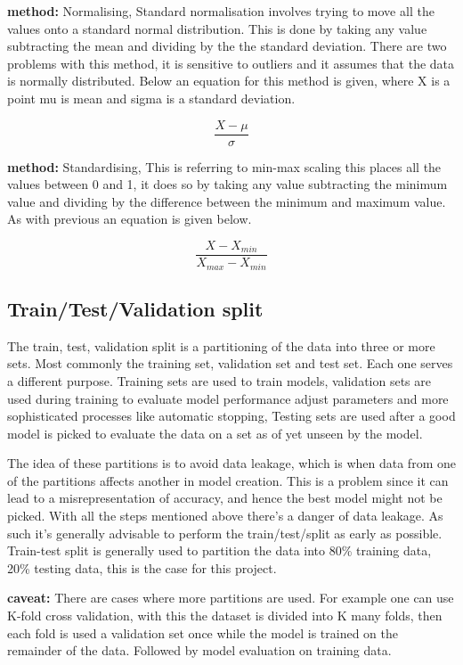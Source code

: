 \documentclass[a4paper]{article}
\begin{document}
\textbf{method:} Normalising, Standard normalisation involves trying to move all the values onto a standard normal distribution. This is done by taking any value subtracting the mean and dividing by the the standard deviation. There are two problems with this method, it is sensitive to outliers and it assumes that the data is normally distributed. Below an equation for this method is given, where X is a point mu is mean and sigma is a standard deviation.

$$\frac{X-\mu}{\sigma}$$

\textbf{method:} Standardising, This is referring to min-max scaling this places all the values between 0 and 1, it does so by taking any value subtracting the minimum value and dividing by the difference between the minimum and maximum value. As with previous an equation is given below. 

$$\frac{X - X_{min}}{X_{max} - X_{min}}$$

\subsection{Train/Test/Validation split}

The train, test, validation split is a partitioning of the data into three or more sets. Most commonly the training set, validation set and test set. Each one serves a different purpose. Training sets are used to train models, validation sets are used during training to evaluate model performance adjust parameters and more sophisticated processes like automatic stopping, Testing sets are used after a good model is picked to evaluate the data on a set as of yet unseen by the model.

The idea of these partitions is to avoid data leakage, which is when data from one of the partitions affects another in model creation. This is a problem since it can lead to a misrepresentation of accuracy, and hence the best model might not be picked. With all the steps mentioned above there's a danger of data leakage. As such it's generally advisable to perform the train/test/split as early as possible. Train-test split is generally used to partition the data into 80\% training data, 20\% testing data, this is the case for this project.

\textbf{caveat:} There are cases where more partitions are used. For example one can use K-fold cross validation, with this the dataset is divided into K many folds, then each fold is used a validation set once while the model is trained on the remainder of the data. Followed by model evaluation on training data. 
\end{document}
